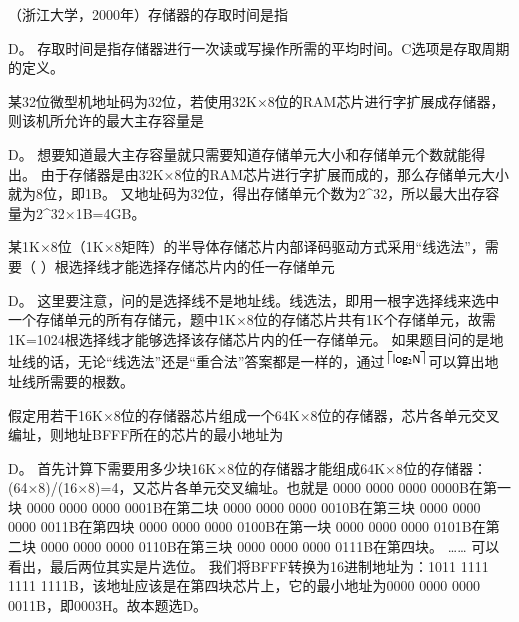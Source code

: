 \question （浙江大学，2000年）存储器的存取时间是指
\par{}
\begin{solution}D。
存取时间是指存储器进行一次读或写操作所需的平均时间。C选项是存取周期的定义。
\end{solution}
\question 某32位微型机地址码为32位，若使用32K×8位的RAM芯片进行字扩展成存储器，则该机所允许的最大主存容量是
\par{}
\begin{solution}D。 想要知道最大主存容量就只需要知道存储单元大小和存储单元个数就能得出。
由于存储器是由32K×8位的RAM芯片进行字扩展而成的，那么存储单元大小就为8位，即1B。
又地址码为32位，得出存储单元个数为2\^{}32，所以最大出存容量为2\^{}32×1B=4GB。
\end{solution}
\question 某1K×8位（1K×8矩阵）的半导体存储芯片内部译码驱动方式采用``线选法''，需要（
）根选择线才能选择存储芯片内的任一存储单元
\par{}
\begin{solution}D。
这里要注意，问的是选择线不是地址线。线选法，即用一根字选择线来选中一个存储单元的所有存储元，题中1K×8位的存储芯片共有1K个存储单元，故需1K=1024根选择线才能够选择该存储芯片内的任一存储单元。
如果题目问的是地址线的话，无论``线选法''还是``重合法''答案都是一样的，通过\includegraphics[width=0.45833in,height=0.18750in]{computerassets/018a53d6590bef422ef084b772e297be.jpeg}可以算出地址线所需要的根数。
\end{solution}
\question 假定用若干16K×8位的存储器芯片组成一个64K×8位的存储器，芯片各单元交叉编址，则地址BFFF所在的芯片的最小地址为
\par{}
\begin{solution}D。 首先计算下需要用多少块16K×8位的存储器才能组成64K×8位的存储器：
(64×8)/(16×8)=4，又芯片各单元交叉编址。也就是 0000 0000 0000
0000B在第一块 0000 0000 0000 0001B在第二块 0000 0000 0000 0010B在第三块
0000 0000 0000 0011B在第四块 0000 0000 0000 0100B在第一块 0000 0000 0000
0101B在第二块 0000 0000 0000 0110B在第三块 0000 0000 0000
0111B在第四块。 \ldots{}\ldots{} 可以看出，最后两位其实是片选位。
我们将BFFF转换为16进制地址为：1011 1111 1111
1111B，该地址应该是在第四块芯片上，它的最小地址为0000 0000 0000
0011B，即0003H。故本题选D。
\end{solution}
